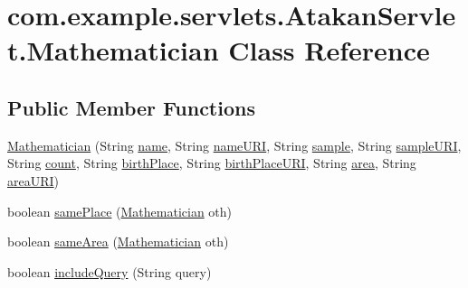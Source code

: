 \hypertarget{classcom_1_1example_1_1servlets_1_1_atakan_servlet_1_1_mathematician}{}\section{com.\+example.\+servlets.\+Atakan\+Servlet.\+Mathematician Class Reference}
\label{classcom_1_1example_1_1servlets_1_1_atakan_servlet_1_1_mathematician}
\subsection*{Public Member Functions}
\begin{DoxyCompactItemize}
\item 
\hyperlink{classcom_1_1example_1_1servlets_1_1_atakan_servlet_1_1_mathematician_a3dd6d65571984435f48d89b7c62a89bf}{Mathematician} (String \hyperlink{classcom_1_1example_1_1servlets_1_1_atakan_servlet_1_1_mathematician_aecaff5d99b81df1d9e8e0f72b1dbb58d}{name}, String \hyperlink{classcom_1_1example_1_1servlets_1_1_atakan_servlet_1_1_mathematician_a620593b98fb441a8e7001b3c6d58b711}{name\+U\+RI}, String \hyperlink{classcom_1_1example_1_1servlets_1_1_atakan_servlet_1_1_mathematician_ae895437cf6140abf4afb34b0495cf5bf}{sample}, String \hyperlink{classcom_1_1example_1_1servlets_1_1_atakan_servlet_1_1_mathematician_a117d588b1ebe1e50099a31ac3fa76d01}{sample\+U\+RI}, String \hyperlink{classcom_1_1example_1_1servlets_1_1_atakan_servlet_1_1_mathematician_a448984baceec15920e764d7415986ba9}{count}, String \hyperlink{classcom_1_1example_1_1servlets_1_1_atakan_servlet_1_1_mathematician_a7cd962c07d10aa8863792e3c96f8535e}{birth\+Place}, String \hyperlink{classcom_1_1example_1_1servlets_1_1_atakan_servlet_1_1_mathematician_aba43184af90f2a158cb8c46e749c4b40}{birth\+Place\+U\+RI}, String \hyperlink{classcom_1_1example_1_1servlets_1_1_atakan_servlet_1_1_mathematician_af461f1e047696a1ef9a2ff3b8da73b90}{area}, String \hyperlink{classcom_1_1example_1_1servlets_1_1_atakan_servlet_1_1_mathematician_ae9dbef6ce6fe9d278948f8549b1ee392}{area\+U\+RI})
\item 
boolean \hyperlink{classcom_1_1example_1_1servlets_1_1_atakan_servlet_1_1_mathematician_a7f218676b02242e2a2f828787df7cf24}{same\+Place} (\hyperlink{classcom_1_1example_1_1servlets_1_1_atakan_servlet_1_1_mathematician}{Mathematician} oth)
\item 
boolean \hyperlink{classcom_1_1example_1_1servlets_1_1_atakan_servlet_1_1_mathematician_a5e388fa26df279a0d62b332ebb847ef2}{same\+Area} (\hyperlink{classcom_1_1example_1_1servlets_1_1_atakan_servlet_1_1_mathematician}{Mathematician} oth)
\item 
boolean \hyperlink{classcom_1_1example_1_1servlets_1_1_atakan_servlet_1_1_mathematician_a2ded5a2636fe235baef719d9f16ad2e1}{include\+Query} (String query)
\end{DoxyCompactItemize}
